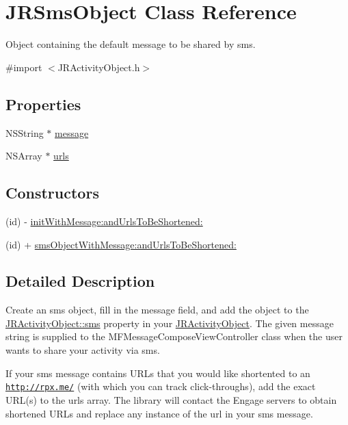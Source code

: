 \hypertarget{interface_j_r_sms_object}{
\section{JRSmsObject Class Reference}
\label{interface_j_r_sms_object}
}


Object containing the default message to be shared by sms.  




{\ttfamily \#import $<$JRActivityObject.h$>$}

\subsection*{Properties}
\begin{DoxyCompactItemize}
\item 
NSString $\ast$ \hyperlink{interface_j_r_sms_object_a6d74c049eba0e6ecfae0e25cffd77d6e}{message}
\item 
NSArray $\ast$ \hyperlink{interface_j_r_sms_object_a181c9385d2dc5ade8b096e2302a47a50}{urls}
\end{DoxyCompactItemize}
\subsection*{Constructors}
\label{_amgrp559a25fdb98a7d1fd1c3771ac568d5e9}
 \begin{DoxyCompactItemize}
\item 
(id) -\/ \hyperlink{interface_j_r_sms_object_a7669f3987b203f6235c5d6e9b0b81535}{initWithMessage:andUrlsToBeShortened:}
\item 
(id) + \hyperlink{interface_j_r_sms_object_a7405d41cfdc3add99e5f8c8c8d1f9c10}{smsObjectWithMessage:andUrlsToBeShortened:}
\end{DoxyCompactItemize}


\subsection{Detailed Description}
Create an sms object, fill in the message field, and add the object to the \hyperlink{interface_j_r_activity_object_a7719b59135bd02dbd03d4b35b17cb0a0}{JRActivityObject::sms} property in your \hyperlink{interface_j_r_activity_object}{JRActivityObject}. The given message string is supplied to the MFMessageComposeViewController class when the user wants to share your activity via sms.

If your sms message contains URLs that you would like shortented to an \href{http://rpxnow.com/docs/iphone#shortenUrls}{\tt http://rpx.me/} (with which you can track click-\/throughs), add the exact URL(s) to the {\ttfamily urls} array. The library will contact the Engage servers to obtain shortened URLs and replace any instance of the url in your sms message.

